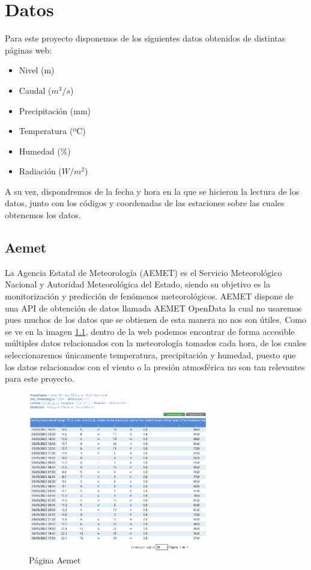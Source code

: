 \chapter[Datos]{Datos}
\label{Chap3}

Para este proyecto disponemos de los siguientes datos obtenidos de distintas páginas web:
\begin{itemize}
	\item Nivel (m)
	\item Caudal ($m^3/s$)
	\item Precipitación (mm)
	\item Temperatura (ºC)
	\item Humedad (\%)
	\item Radiación ($W/m^2$)
\end{itemize}
A su vez, dispondremos de la fecha y hora en la que se hicieron la lectura de los datos, junto con los códigos y coordenadas de las estaciones sobre las cuales obtenemos los datos.

\section{Aemet}
La Agencia Estatal de Meteorología (AEMET) es el Servicio Meteorológico Nacional y Autoridad Meteorológica del Estado, siendo su objetivo es la monitorización y predicción de fenómenos meteorológicos.
\newline
\newline
AEMET dispone de una API de obtención de datos llamada AEMET OpenData la cual no usaremos pues muchos de los datos que se obtienen de esta manera no nos son útiles.
\newline
\newline
Como se ve en la imagen \ref{fig:ej3}, dentro de la web podemos encontrar de forma accesible múltiples datos relacionados con la meteorología tomados cada hora, de los cuales seleccionaremos únicamente temperatura, precipitación y humedad, puesto que los datos relacionados con el viento o la presión atmosférica no son tan relevantes para este proyecto.

\begin{figure} [h!]
	\centering
	\includegraphics[width=0.7\textwidth]{fig/Aemet.png}
	\caption[Página Aemet de la estación en Aranguren (Navarra)]{Página Aemet}
	\label{fig:ej3}
\end{figure}

